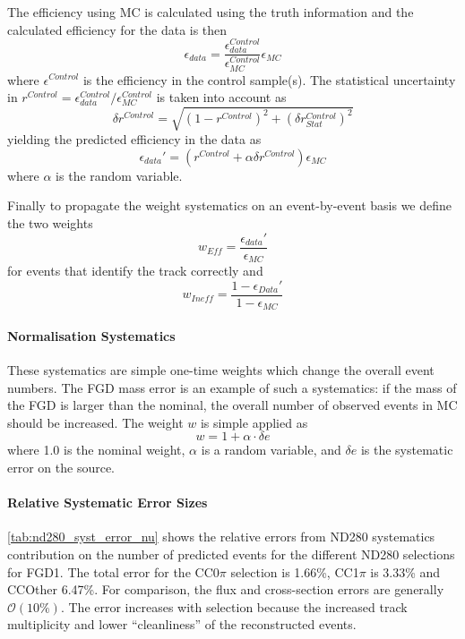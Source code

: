 The efficiency using MC is calculated using the truth information and the calculated efficiency for the data is then
\begin{equation}
\epsilon_{data} = \frac{\epsilon_{data}^{Control}}{\epsilon_{MC}^{Control}} \epsilon_{MC}
\end{equation}
where $\epsilon^{Control}$ is the efficiency in the control sample(s). The statistical uncertainty in $r^{Control} = \epsilon^{Control}_{data}/\epsilon^{Control}_{MC}$ is taken into account as
\begin{equation}
\delta r^{Control} = \sqrt{\left(1-r^{Control}\right)^2 + \left(\delta r^{Control}_{Stat}\right)^2}
\end{equation}
yielding the predicted efficiency in the data as
\begin{equation}
\epsilon_{data}' = \left(r^{Control} + \alpha \delta r^{Control}\right)\epsilon_{MC}
\end{equation}
where $\alpha$ is the random variable.

Finally to propagate the weight systematics on an event-by-event basis we define the two weights
\begin{equation}
w_{Eff} = \frac{\epsilon_{data}'}{\epsilon_{MC}}
\end{equation}
for events that identify the track correctly and
\begin{equation}
w_{Ineff} = \frac{1-\epsilon_{Data}'}{1-\epsilon_{MC}}
\end{equation}

\paragraph{Normalisation Systematics}
These systematics are simple one-time weights which change the overall event numbers. The FGD mass error is an example of such a systematics: if the mass of the FGD is larger than the nominal, the overall number of observed events in MC should be increased. The weight $w$ is simple applied as
\begin{equation}
w = 1+\alpha \cdot \delta e
\end{equation}
where 1.0 is the nominal weight, $\alpha$ is a random variable, and $\delta e$ is the systematic error on the source.

\paragraph{Relative Systematic Error Sizes}
\autoref{tab:nd280_syst_error_nu} shows the relative errors from ND280 systematics contribution on the number of predicted events for the different ND280 \numu selections for FGD1. The total error for the CC0$\pi$ selection is 1.66\%, CC1$\pi$ is 3.33\% and CCOther 6.47\%. For comparison, the flux and cross-section errors are generally $\mathcal{O}\left(10\%\right)$. The error increases with selection because the increased track multiplicity and lower ``cleanliness'' of the reconstructed events. 

